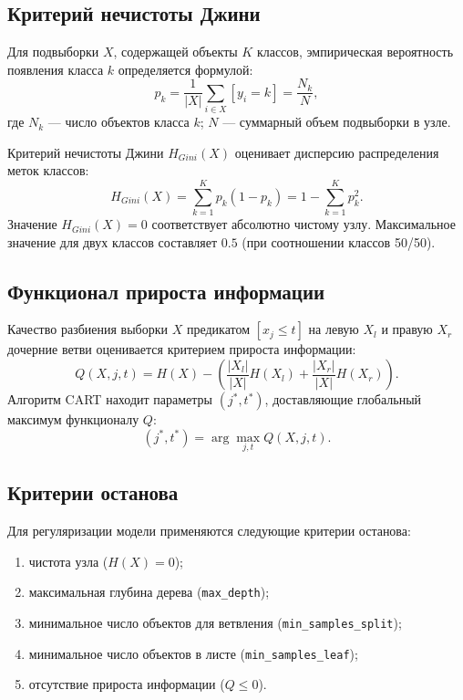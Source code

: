 \documentclass[14pt,a4paper]{extarticle}
\begin{document}
\subsection{Критерий нечистоты Джини}
Для подвыборки $X$, содержащей объекты $K$ классов, эмпирическая вероятность появления класса $k$ определяется формулой:
\begin{equation}
    p_k = \frac{1}{|X|} \sum_{i \in X} [y_i = k] = \frac{N_k}{N},
\end{equation}
где $N_k$ --- число объектов класса $k$; $N$ --- суммарный объем подвыборки в узле.

Критерий нечистоты Джини $H_{Gini}(X)$ оценивает дисперсию распределения меток классов:
\begin{equation}
    H_{Gini}(X) = \sum_{k=1}^K p_k (1 - p_k) = 1 - \sum_{k=1}^K p_k^2.
\end{equation}
Значение $H_{Gini}(X) = 0$ соответствует абсолютно чистому узлу. Максимальное значение для двух классов составляет $0.5$ (при соотношении классов 50/50).

\subsection{Функционал прироста информации}
Качество разбиения выборки $X$ предикатом $[x_j \le t]$ на левую $X_l$ и правую $X_r$ дочерние ветви оценивается критерием прироста информации:
\begin{equation}
    Q(X, j, t) = H(X) - \left( \frac{|X_l|}{|X|} H(X_l) + \frac{|X_r|}{|X|} H(X_r) \right).
\end{equation}
Алгоритм CART находит параметры $(j^*, t^*)$, доставляющие глобальный максимум функционалу $Q$:
\begin{equation}
    (j^*, t^*) = \arg\max_{j, t} Q(X, j, t).
\end{equation}

\subsection{Критерии останова}
Для регуляризации модели применяются следующие критерии останова:
\begin{enumerate}
    \item чистота узла ($H(X) = 0$);
    \item максимальная глубина дерева (\texttt{max\_depth});
    \item минимальное число объектов для ветвления (\texttt{min\_samples\_split});
    \item минимальное число объектов в листе (\texttt{min\_samples\_leaf});
    \item отсутствие прироста информации ($Q \le 0$).
\end{enumerate}
\end{document}
